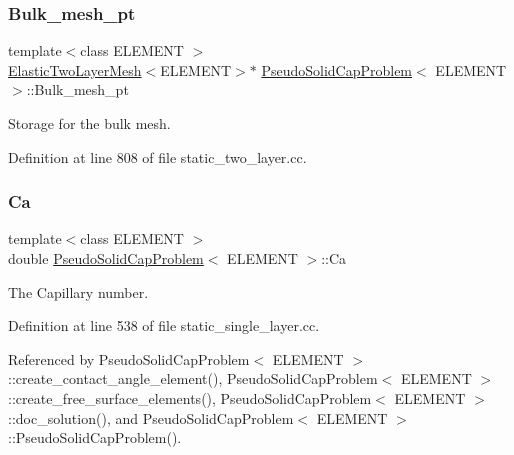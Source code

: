 \subsubsection{\texorpdfstring{Bulk\+\_\+mesh\+\_\+pt}{Bulk\_mesh\_pt}\hspace{0.1cm}{\footnotesize\ttfamily [2/2]}}
{\footnotesize\ttfamily template$<$class E\+L\+E\+M\+E\+NT $>$ \\
\hyperlink{classElasticTwoLayerMesh}{Elastic\+Two\+Layer\+Mesh}$<$E\+L\+E\+M\+E\+NT$>$$\ast$ \hyperlink{classPseudoSolidCapProblem}{Pseudo\+Solid\+Cap\+Problem}$<$ E\+L\+E\+M\+E\+NT $>$\+::Bulk\+\_\+mesh\+\_\+pt\hspace{0.3cm}{\ttfamily [private]}}



Storage for the bulk mesh. 



Definition at line 808 of file static\+\_\+two\+\_\+layer.\+cc.

\mbox{\label{classPseudoSolidCapProblem_ad29a43062d88106c495d407abeddd88d}} 
\subsubsection{\texorpdfstring{Ca}{Ca}}
{\footnotesize\ttfamily template$<$class E\+L\+E\+M\+E\+NT $>$ \\
double \hyperlink{classPseudoSolidCapProblem}{Pseudo\+Solid\+Cap\+Problem}$<$ E\+L\+E\+M\+E\+NT $>$\+::Ca\hspace{0.3cm}{\ttfamily [private]}}



The Capillary number. 



Definition at line 538 of file static\+\_\+single\+\_\+layer.\+cc.



Referenced by Pseudo\+Solid\+Cap\+Problem$<$ E\+L\+E\+M\+E\+N\+T $>$\+::create\+\_\+contact\+\_\+angle\+\_\+element(), Pseudo\+Solid\+Cap\+Problem$<$ E\+L\+E\+M\+E\+N\+T $>$\+::create\+\_\+free\+\_\+surface\+\_\+elements(), Pseudo\+Solid\+Cap\+Problem$<$ E\+L\+E\+M\+E\+N\+T $>$\+::doc\+\_\+solution(), and Pseudo\+Solid\+Cap\+Problem$<$ E\+L\+E\+M\+E\+N\+T $>$\+::\+Pseudo\+Solid\+Cap\+Problem().

\mbox{\label{classPseudoSolidCapProblem_a9eb1383956f3448a8c2e163aa2db72d7}} 
